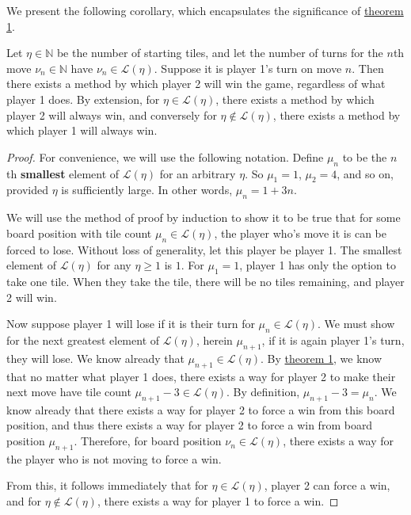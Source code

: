 \documentclass[11pt, letterpaper]{article}
\begin{document}
We present the following corollary, which encapsulates the significance of \hyperref[lma:1]{theorem 1}.
\begin{corollary}\label{cor:1}
	Let $\eta \in\mathbb{N}$ be the number of starting tiles, and let the number of turns for the $n$th move $\nu_n\in\mathbb{N}$ have $\nu _n\in\mathcal{L} (\eta )$. Suppose it is player 1's turn on move $n$. Then there exists a method by which player 2 will win the game, regardless of what player 1 does. By extension, for $\eta \in \mathcal{L} (\eta )$, there exists a method by which player 2 will always win, and conversely for $\eta \notin \mathcal{L} (\eta )$, there exists a method by which player 1 will always win.
\end{corollary}
\begin{proof}
For convenience, we will use the following notation. Define $\mu_n$ to be the $n$th \textbf{smallest} element of $\mathcal{L} (\eta )$ for an arbitrary $\eta $. So $\mu _1=1$, $\mu_2=4$, and so on, provided $\eta $ is sufficiently large. In other words, $\mu_n = 1+3n$.

	We will use the method of proof by induction to show it to be true that for some board position with tile count $\mu _n\in\mathcal{L} (\eta )$, the player who's move it is can be forced to lose. Without loss of generality, let this player be player 1. The smallest element of $\mathcal{L} (\eta )$ for any $\eta \geq 1$ is $1$. For $\mu_1 =1$, player 1 has only the option to take one tile. When they take the tile, there will be no tiles remaining, and player 2 will win.

	Now suppose player 1 will lose if it is their turn for $\mu _n\in \mathcal{L} (\eta )$. We must show for the next greatest element of $\mathcal{L} (\eta )$, herein $\mu_{n+1} $, if it is again player 1's turn, they will lose. We know already that $\mu _{n+1}\in \mathcal{L} (\eta )$. By \hyperref[lma:1]{theorem 1}, we know that no matter what player 1 does, there exists a way for player 2 to make their next move have tile count $\mu_{n+1}-3\in\mathcal{L} (\eta )$. By definition, $\mu_{n+1}-3=\mu_n$. We know already that there exists a way for player 2 to force a win from this board position, and thus there exists a way for player 2 to force a win from board position $\mu_{n+1}$. Therefore, for board position $\nu_n\in\mathcal{L} (\eta )$, there exists a way for the player who is not moving to force a win.

	From this, it follows immediately that for $\eta \in \mathcal{L} (\eta )$, player 2 can force a win, and for $\eta \notin \mathcal{L} (\eta )$, there exists a way for player 1 to force a win.
\end{proof}
\end{document}
